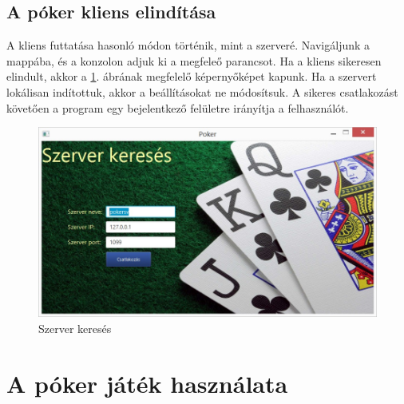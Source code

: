 \subsection{A póker kliens elindítása}
A kliens futtatása hasonló módon történik, mint a szerveré. Navigáljunk a  mappába, és a konzolon adjuk ki a megfeleő parancsot. Ha a kliens sikeresen elindult, akkor a \ref{fig:server_search}. ábrának megfelelő képernyőképet kapunk. Ha a szervert lokálisan indítottuk, akkor a beállításokat ne módosítsuk. A sikeres csatlakozást követően a program egy bejelentkező felületre irányítja a felhasználót. \\

\begin{figure}[h!]
  \caption{Szerver keresés}
  \label{fig:server_search}
  \centering
    \includegraphics[width=12cm]{user-documentation/images/server-search.jpg}
\end{figure}

\section{A póker játék használata}

